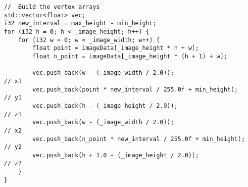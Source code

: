 \begin{lstlisting}
// 	Build the vertex arrays
std::vector<float> vec;
i32 new_interval = max_height - min_height;
for (i32 h = 0; h < _image_height; h++) {
    for (i32 w = 0; w < _image_width; w++) {
        float point = imageData[_image_height * h + w];
        float n_point = imageData[_image_height * (h + 1) + w];

        vec.push_back(w - (_image_width / 2.0));                     // x1
        vec.push_back(point * new_interval / 255.0f + min_height);   // y1
        vec.push_back(h - (_image_height / 2.0));                    // z1
        vec.push_back(w - (_image_width / 2.0));                     // x2
        vec.push_back(n_point * new_interval / 255.0f + min_height); // y2
        vec.push_back(h + 1.0 - (_image_height / 2.0));              // z2
    }
}
\end{lstlisting}
